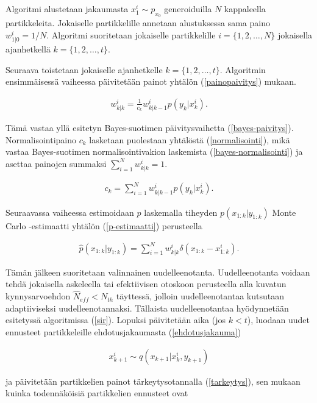 \documentclass[
  12pt,
  a4paper, twoside]{book}
\begin{document}
Algoritmi alustetaan jakaumasta \(x_1^i\sim p_{x_0}\) generoiduilla \(N\) kappaleella partikkeleita. Jokaiselle partikkelille annetaan alustuksessa sama paino \(w_{1|0}^i=1/N\). Algoritmi suoritetaan jokaiselle partikkelille \(i=\{1,2,\ldots,N\}\) jokaisella ajanhetkellä \(k=\{1,2,\ldots,t\}\).

Seuraava toistetaan jokaiselle ajanhetkelle \(k=\{1,2,\ldots,t\}\). Algoritmin ensimmäisessä vaiheessa päivitetään painot yhtälön (\ref{painopaivitys}) mukaan.

\begin{align}\label{painopaivitys}
w^i_{k|k}=\frac{1}{c_k}w^i_{k|k-1}p(y_k|x^i_k).
\end{align}

\noindent Tämä vastaa yllä esitetyn Bayes-suotimen päivitysvaihetta (\ref{bayes-paivitys}). Normalisointipaino \(c_k\) lasketaan puolestaan yhtälöstä (\ref{normalisointi}), mikä vastaa Bayes-suotimen normalisointivakion laskemista (\ref{bayes-normalisointi}) ja asettaa painojen summaksi \(\sum_{i=1}^Nw^i_{k|k}=1\).

\begin{align}\label{normalisointi}
c_k=\sum_{i=1}^{N}w_{k|{k-1}}^ip(y_k|x_k^i).
\end{align}

\noindent Seuraavassa vaiheessa estimoidaan \(p\) laskemalla tiheyden \(p(x_{1:k}|y_{1:k})\) Monte Carlo -estimaatti yhtälön (\ref{p-estimaatti}) perusteella

\begin{align}\label{p-estimaatti}
\hat{p}(x_{1:k}|y_{1:k})=\sum_{i=1}^{N}w_{k|k}^i \delta(x_{1:k}-x_{1:k}^i).
\end{align}

Tämän jälkeen suoritetaan valinnainen uudelleenotanta. Uudelleenotanta voidaan tehdä jokaisella askeleella tai efektiivisen otoskoon perusteella alla kuvatun kynnysarvoehdon \(\hat{N}_{eff}< N_{th}\) täyttessä, jolloin uudelleenotantaa kutsutaan adaptiiviseksi uudelleenotannaksi. Tällaista uudelleenotantaa hyödynnetään esitetyssä algoritmissa (\ref{sir}). Lopuksi päivitetään aika (jos \(k < t\)), luodaan uudet ennusteet partikkeleille ehdotusjakaumasta (\ref{ehdotusjakauma})

\begin{align}\label{ehdotusjakauma}
x_{k+1}^i\sim q(x_{k+1}|x_k^i,y_{k+1})
\end{align}

\noindent ja päivitetään partikkelien painot tärkeytysotannalla (\ref{tarkeytys}), sen mukaan kuinka todennäköisiä partikkelien ennusteet ovat
\end{document}
